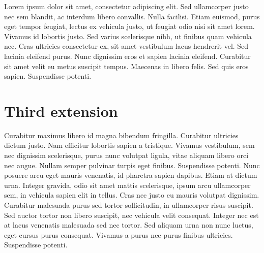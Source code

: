 Lorem ipsum dolor sit amet, consectetur adipiscing elit. Sed ullamcorper justo nec sem blandit, ac interdum libero convallis. Nulla facilisi. Etiam euismod, purus eget tempor feugiat, lectus ex vehicula justo, ut feugiat odio nisi sit amet lorem. Vivamus id lobortis justo. Sed varius scelerisque nibh, ut finibus quam vehicula nec. Cras ultricies consectetur ex, sit amet vestibulum lacus hendrerit vel. Sed lacinia eleifend purus. Nunc dignissim eros et sapien lacinia eleifend. Curabitur sit amet velit eu metus suscipit tempus. Maecenas in libero felis. Sed quis eros sapien. Suspendisse potenti.

\section{Third extension}

Curabitur maximus libero id magna bibendum fringilla. Curabitur ultricies dictum justo. Nam efficitur lobortis sapien a tristique. Vivamus vestibulum, sem nec dignissim scelerisque, purus nunc volutpat ligula, vitae aliquam libero orci nec augue. Nullam semper pulvinar turpis eget finibus. Suspendisse potenti. Nunc posuere arcu eget mauris venenatis, id pharetra sapien dapibus. Etiam at dictum urna. Integer gravida, odio sit amet mattis scelerisque, ipsum arcu ullamcorper sem, in vehicula sapien elit in tellus. Cras nec justo eu mauris volutpat dignissim. Curabitur malesuada purus sed tortor sollicitudin, in ullamcorper risus suscipit. Sed auctor tortor non libero suscipit, nec vehicula velit consequat. Integer nec est at lacus venenatis malesuada sed nec tortor. Sed aliquam urna non nunc luctus, eget cursus purus consequat. Vivamus a purus nec purus finibus ultricies. Suspendisse potenti.

